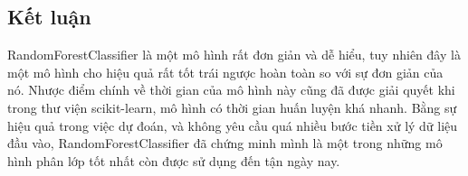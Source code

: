 \documentclass[conference]{IEEEtran}
\begin{document}
\subsection{Kết luận}
RandomForestClassifier là một mô hình rất đơn giản và dễ hiểu, tuy nhiên đây là một mô hình cho hiệu quả rất tốt trái ngược hoàn toàn so với sự đơn giản của nó. Nhược điểm chính về thời gian của mô hình này cũng đã được giải quyết khi trong thư viện scikit-learn, mô hình có thời gian huấn luyện khá nhanh. Bằng sự hiệu quả trong việc dự đoán, và không yêu cầu quá nhiều bước tiền xử lý dữ liệu đầu vào, RandomForestClassifier đã chứng minh mình là một trong những mô hình phân lớp tốt nhất còn được sử dụng đến tận ngày nay.
\end{document}
